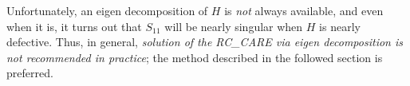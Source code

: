 Unfortunately, an eigen decomposition of $H$ is {\it not} always available, and even when it is, it turns out that $S_{11}$ will be nearly singular
when $H$ is nearly defective.  Thus, in general, {\it solution of the RC_CARE via eigen decomposition is not recommended in practice}; the method
described in the followed section is preferred.


\begin{figure*}[t]

\end{figure*}

